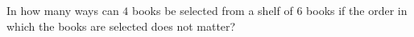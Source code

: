 In how many ways can $4$ books be selected from a shelf of $6$ books if the order in which the books are selected does not matter?
